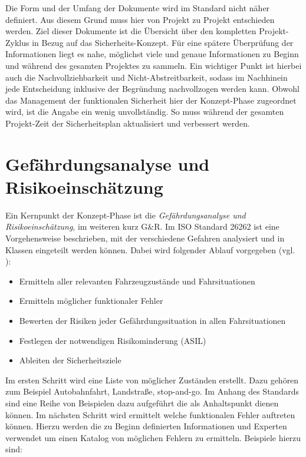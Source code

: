 \documentclass[a4paper,DIV=calc,ngerman]{scrartcl}
\begin{document}
Die Form und der Umfang der Dokumente wird im Standard nicht näher definiert. Aus diesem Grund muss hier von Projekt zu Projekt entschieden werden. Ziel dieser Dokumente ist die Übersicht über den kompletten Projekt-Zyklus in Bezug auf das Sicherheits-Konzept. Für eine spätere Überprüfung der Informationen liegt es nahe, möglichst viele und genaue Informationen zu Beginn und während des gesamten Projektes zu sammeln. Ein wichtiger Punkt ist hierbei auch die Nachvollziehbarkeit und Nicht-Abstreitbarkeit, sodass im Nachhinein jede Entscheidung inklusive der Begründung nachvollzogen werden kann. Obwohl das Management der funktionalen Sicherheit hier der Konzept-Phase zugeordnet wird, ist die Angabe ein wenig unvollständig. So muss während der gesamten Projekt-Zeit der Sicherheitsplan aktualisiert und verbessert werden.




\section{Gefährdungsanalyse und Risikoeinschätzung}
\label{sec:GundR}
Ein Kernpunkt der Konzept-Phase ist die \emph{Gefährdungsanalyse und Risikoeinschätzung}, im weiteren kurz G\&R. Im ISO Standard 26262 ist eine Vorgehensweise beschrieben, mit der verschiedene Gefahren analysiert und in Klassen eingeteilt werden können. Dabei wird folgender Ablauf vorgegeben (vgl. \cite[S. 123]{1}):

\begin{itemize}
    \item Ermitteln aller relevanten Fahrzeugzustände und Fahrsituationen
    \item Ermitteln möglicher funktionaler Fehler
    \item Bewerten der Risiken jeder Gefährdungssituation in allen Fahrsituationen
    \item Festlegen der notwendigen Risikominderung (ASIL)
    \item Ableiten der Sicherheitsziele
\end{itemize}

Im ersten Schritt wird eine Liste von möglicher Zuständen erstellt. Dazu gehören zum Beispiel Autobahnfahrt, Landstraße, stop-and-go. Im Anhang des Standards sind eine Reihe von Beispielen dazu aufgeführt die als Anhaltspunkt dienen können. Im nächsten Schritt wird ermittelt welche funktionalen Fehler auftreten können. Hierzu werden die zu Beginn definierten Informationen und Experten verwendet um einen Katalog von möglichen Fehlern zu ermitteln. Beispiele hierzu sind:
\end{document}
